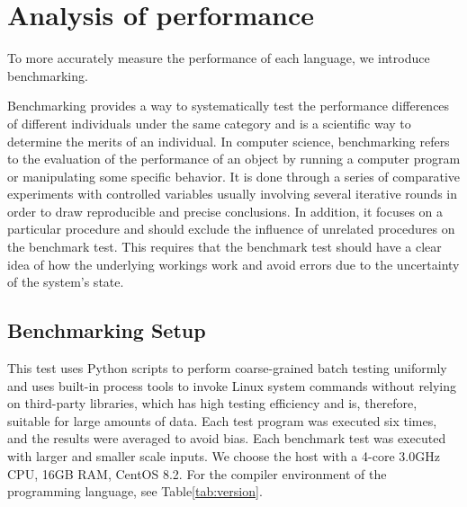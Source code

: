 \section{Analysis of performance}

To more accurately measure the performance of each language, we introduce benchmarking.

Benchmarking provides a way to systematically test the
performance differences of different individuals under the same
category and is a scientific way to determine the merits of
an individual\cite{hockney1996science}.
In computer science, benchmarking refers to the evaluation of
the performance of an object by running a computer program or
manipulating some specific behavior.
It is done through a series of comparative experiments with
controlled variables usually involving several iterative rounds
in order to draw reproducible and precise conclusions\cite{fleming1986not}.
In addition, it focuses on a particular procedure and
should exclude the influence of unrelated procedures on
the benchmark test.
This requires that the benchmark test should have a
clear idea of how the underlying workings work and avoid errors
due to the uncertainty of the system's state.


\subsection{Benchmarking Setup}


This test uses Python scripts to perform coarse-grained
batch testing uniformly and uses built-in process tools
to invoke Linux system commands without relying on
third-party libraries, which has high testing efficiency
and is, therefore, suitable for large amounts of data.
Each test program was executed six times, and the results
were averaged to avoid bias.
Each benchmark test was
executed with larger and smaller scale inputs.
We choose the host with a 4-core 3.0GHz CPU, 16GB RAM, CentOS 8.2.
For the compiler environment of the programming
language, see Table\ref{tab:version}.

